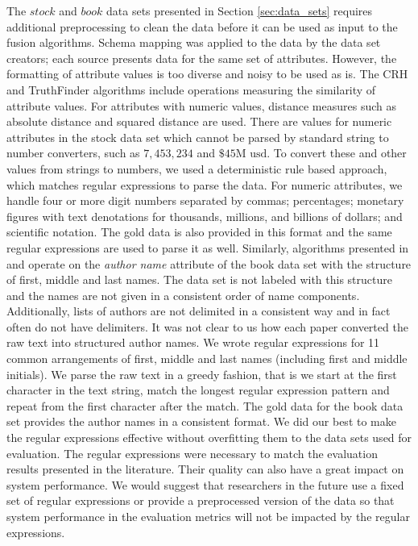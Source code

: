 \documentclass{acm_proc_article-sp}
\begin{document}
The $stock$ and $book$ data sets presented in Section \ref{sec:data_sets} requires additional preprocessing to clean the data before it can be used as input to the fusion algorithms. Schema mapping was applied to the data by the data set creators; each source presents data for the same set of attributes. However, the formatting of attribute values is too diverse and noisy to be used as is.  The {\sc CRH} and {\sc TruthFinder} algorithms include operations measuring the similarity of attribute values. For attributes with numeric values, distance measures such as absolute distance and squared distance are used.  There are values for numeric attributes in the stock data set which cannot be parsed by standard string to number converters, such as $7,453,234$ and $\$45\text{M usd}$. To convert these and other values from strings to numbers, we used a deterministic rule based approach, which matches regular expressions to parse the data. For numeric attributes, we handle four or more digit numbers separated by commas; percentages; monetary figures with text denotations for thousands, millions, and billions of dollars; and scientific notation. The gold data is also provided in this format and the same regular expressions are used to parse it as well. Similarly, algorithms presented in \cite{dong:integrating} and \cite{yin:truth} operate on the \emph{author name} attribute of the book data set with the structure of first, middle and last names. The data set is not labeled with this structure and the names are not given in a consistent order of name components. Additionally, lists of authors are not delimited in a consistent way and in fact often do not have delimiters. It was not clear to us how each paper converted the raw text into structured author names. We wrote regular expressions for  11 common arrangements of first, middle and last names (including first and middle initials). We parse the raw text in a greedy fashion, that is we start at the first character in the text string, match the longest regular expression pattern and repeat from the first character after the match. The gold data for the book data set provides the author names in a consistent format. We did our best to make the regular expressions effective without overfitting them to the data sets used for evaluation. The regular expressions were necessary to match the evaluation results presented in the literature. Their quality can also have a great impact on system performance. We would suggest that researchers in the future use a fixed set of regular expressions or provide a preprocessed version of the data so that system performance in the evaluation metrics will not be impacted by the regular expressions. 
\end{document}
